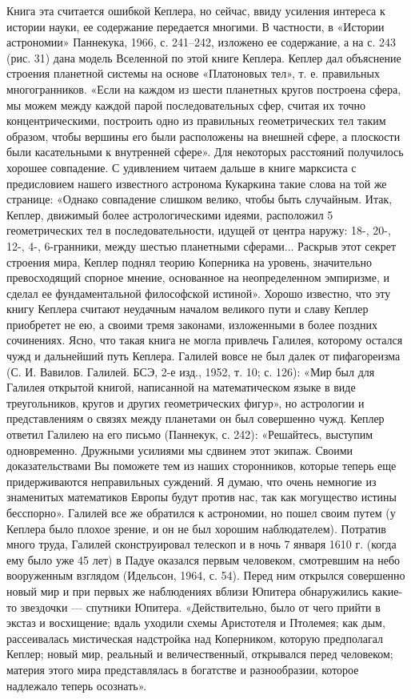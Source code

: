 Книга эта считается ошибкой Кеплера, но сейчас, ввиду усиления интереса к
истории науки, ее содержание передается многими. В частности, в «Истории
астрономии» Паннекука, 1966, с. 241--242, изложено ее содержание, а на с. 243
(рис. 31) дана модель Вселенной по этой книге Кеплера. Кеплер дал
объяснение строения планетной системы на основе «Платоновых тел», т. е.
правильных многогранников. «Если на каждом из шести планетных кругов
построена сфера, мы можем между каждой парой последовательных сфер, считая их
точно концентрическими, построить одно из правильных геометрических тел
таким образом, чтобы вершины его были расположены на внешней сфере, а
плоскости были касательными к внутренней сфере». Для некоторых расстояний
получилось хорошее совпадение. С удивлением читаем дальше в книге марксиста с
предисловием нашего известного астронома Кукаркина такие слова на той же
странице: «Однако совпадение слишком велико, чтобы быть случайным. Итак,
Кеплер, движимый более астрологическими идеями, расположил 5 геометрических тел
в последовательности, идущей от центра наружу: 18-, 20-, 12-, 4-,
6-гранники, между шестью планетными сферами... Раскрыв этот секрет строения
мира, Кеплер поднял теорию Коперника на уровень, значительно превосходящий
спорное мнение, основанное на неопределенном эмпиризме, и сделал ее
фундаментальной философской истиной». Хорошо известно, что эту книгу
Кеплера считают неудачным началом великого пути и славу Кеплер приобретет не
ею, а своими тремя законами, изложенными в более поздних сочинениях. Ясно, что
такая книга не могла привлечь Галилея, которому остался чужд и дальнейший
путь Кеплера. Галилей вовсе не был далек от пифагореизма (С. И. Вавилов.
Галилей. БСЭ, 2-е изд., 1952, т. 10; с. 126): «Мир был для Галилея открытой
книгой, написанной на математическом языке в виде треугольников, кругов и
других геометрических фигур», но астрологии и представлениям о связях между
планетами он был совершенно чужд. Кеплер ответил Галилею на его письмо
(Паннекук, с. 242): «Решайтесь, выступим одновременно. Дружными усилиями мы
сдвинем этот экипаж. Своими доказательствами Вы поможете тем из наших
сторонников, которые теперь еще придерживаются неправильных суждений. Я
думаю, что очень немногие из знаменитых математиков Европы будут против
нас, так как могущество истины бесспорно». Галилей все же обратился к
астрономии, но пошел своим путем (у Кеплера
было плохое зрение, и он не был хорошим наблюдателем). Потратив много труда,
Галилей сконструировал телескоп и в ночь 7 января 1610 г. (когда ему было уже
45 лет) в Падуе оказался первым человеком, смотревшим на небо вооруженным
взглядом (Идельсон, 1964, с. 54). Перед ним открылся совершенно новый мир и при
первых же наблюдениях вблизи Юпитера обнаружились какие-то звездочки --- спутники
Юпитера. «Действительно, было от чего прийти в экстаз и восхищение; вдаль
уходили схемы Аристотеля и Птолемея; как дым, рассеивалась мистическая
надстройка над Коперником, которую предполагал Кеплер; новый мир, реальный и
величественный, открывался перед человеком; материя этого мира представлялась в
богатстве и разнообразии, которое надлежало теперь осознать».

